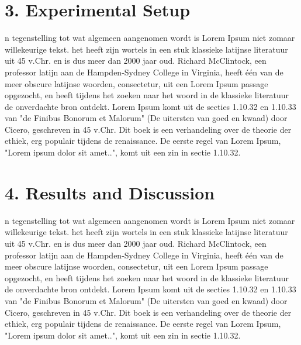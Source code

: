 \begin{multicols}{2}
\section*{3. Experimental Setup}
n tegenstelling tot wat algemeen aangenomen wordt is Lorem Ipsum niet zomaar willekeurige tekst. het heeft zijn wortels in een stuk klassieke latijnse literatuur uit 45 v.Chr. en is dus meer dan 2000 jaar oud. Richard McClintock, een professor latijn aan de Hampden-Sydney College in Virginia, heeft één van de meer obscure latijnse woorden, consectetur, uit een Lorem Ipsum passage opgezocht, en heeft tijdens het zoeken naar het woord in de klassieke literatuur de onverdachte bron ontdekt. Lorem Ipsum komt uit de secties 1.10.32 en 1.10.33 van "de Finibus Bonorum et Malorum" (De uitersten van goed en kwaad) door Cicero, geschreven in 45 v.Chr. Dit boek is een verhandeling over de theorie der ethiek, erg populair tijdens de renaissance. De eerste regel van Lorem Ipsum, "Lorem ipsum dolor sit amet..", komt uit een zin in sectie 1.10.32.

\section*{4. Results and Discussion}
n tegenstelling tot wat algemeen aangenomen wordt is Lorem Ipsum niet zomaar willekeurige tekst. het heeft zijn wortels in een stuk klassieke latijnse literatuur uit 45 v.Chr. en is dus meer dan 2000 jaar oud. Richard McClintock, een professor latijn aan de Hampden-Sydney College in Virginia, heeft één van de meer obscure latijnse woorden, consectetur, uit een Lorem Ipsum passage opgezocht, en heeft tijdens het zoeken naar het woord in de klassieke literatuur de onverdachte bron ontdekt. Lorem Ipsum komt uit de secties 1.10.32 en 1.10.33 van "de Finibus Bonorum et Malorum" (De uitersten van goed en kwaad) door Cicero, geschreven in 45 v.Chr. Dit boek is een verhandeling over de theorie der ethiek, erg populair tijdens de renaissance. De eerste regel van Lorem Ipsum, "Lorem ipsum dolor sit amet..", komt uit een zin in sectie 1.10.32.











\printbibliography[heading=subbibliography, keyword={eng_summary}]
\end{multicols}
